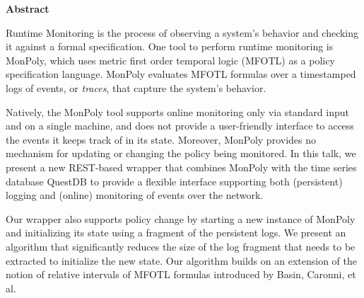 \begin{center}
\textbf{Abstract}
\end{center}

Runtime Monitoring is the process of observing a system's behavior and checking it against a formal specification.
One tool to perform runtime monitoring is MonPoly, which uses metric first order temporal logic (MFOTL) as a policy specification language.
MonPoly evaluates MFOTL formulas over a timestamped logs of events, or \emph{traces}, that capture the system's behavior.

Natively, the MonPoly tool supports online monitoring only via standard input and on a single machine,
and does not provide a user-friendly interface to access the events it keeps track of in its state.
Moreover, MonPoly provides no mechanism for updating or changing the policy being monitored.
In this talk, we present a new REST-based wrapper that combines MonPoly with the time series database QuestDB to provide a flexible interface supporting both (persistent) logging and (online) monitoring
of events over the network.

Our wrapper also supports policy change by starting a new instance of MonPoly and initializing its state using a fragment of the persistent logs.
We present an algorithm that significantly reduces the size of the log fragment that needs to be extracted to initialize the new state.
Our algorithm builds on an extension of the notion of relative intervals of MFOTL formulas introduced by Basin, Caronni, et al. 